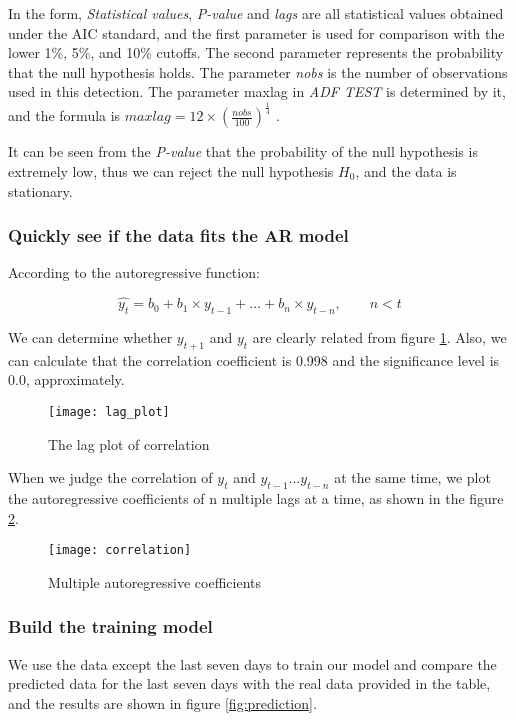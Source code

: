 \documentclass{mcmthesis}
\begin{document}
In the form, \textit{Statistical values}, \textit{P-value} and \textit{lags} are all statistical values obtained under the AIC standard, and the first parameter is used for comparison with the lower 1\%, 5\%, and 10\% cutoffs.
The second parameter represents the probability that the null hypothesis holds.
The parameter \textit{nobs} is the number of observations used in this detection.
The parameter maxlag in \textit{ADF TEST} is determined by it, and the formula is $ \displaystyle maxlag = 12 \times ( \frac{nobs}{100}) ^\frac{1}{4} $ .

It can be seen from the \textit{P-value} that the probability of the null hypothesis is extremely low, thus we can reject the null hypothesis $H_0$, and the data is stationary.

\subsubsection{Quickly see if the data fits the AR model}
  According to the autoregressive function:

  \begin{equation}
    \hat{y_t} = b_0 + b_1 \times y_{t - 1} + \ldots + b_n \times y_{t - n}, \qquad n < t
  \end{equation}

  We can determine whether $ y_{t + 1}$ and $ y_t $ are clearly related from figure \ref{fig:lag_plot}. Also, we can calculate that the correlation coefficient is 0.998 and the significance level is 0.0, approximately.

  \begin{figure}[h]
    \centering
    \texttt{[image: lag\_plot]}
    \caption{The lag plot of correlation}
    \label{fig:lag_plot}
  \end{figure}

  When we judge the correlation of $ y_t$ and $ y_{t - 1} \ldots y_{t - n} $ at the same time, we plot the autoregressive coefficients of n multiple lags at a time, as shown in the figure \ref{fig:correlation}.

  \begin{figure}[h]
    \centering
    \texttt{[image: correlation]}
    \caption{Multiple autoregressive coefficients}
    \label{fig:correlation}
  \end{figure}

\subsubsection{Build the training model}
We use the data except the last seven days to train our model and compare the predicted data for the last seven days with the real data provided in the table, and the results are shown in figure \ref{fig:prediction}.
\end{document}
